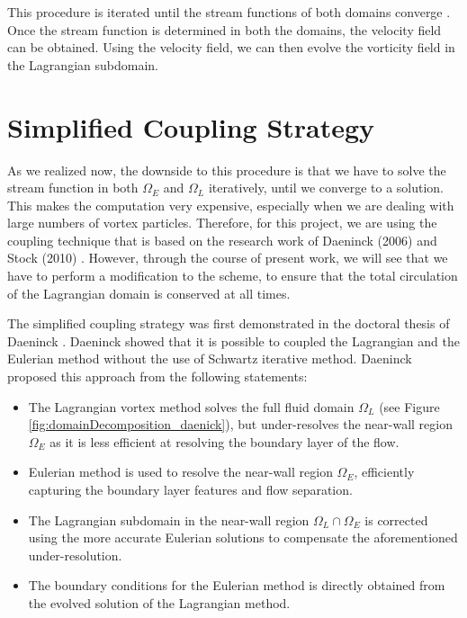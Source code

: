 	This procedure is iterated until the stream functions of both domains converge \cite{Ould-Salihi2001a}. Once the stream function is determined in both the domains, the velocity field can be obtained. Using the velocity field, we can then evolve the vorticity field in the Lagrangian subdomain.

	\section{Simplified Coupling Strategy}
	\label{sec:helvpm-scs}
	
	As we realized now, the downside to this procedure is that we have to solve the stream function in both $\Omega_E$ and $\Omega_L$ iteratively, until we converge to a solution. This makes the computation very expensive, especially when we are dealing with large numbers of vortex particles. Therefore, for this project, we are using the coupling technique that is based on the research work of Daeninck (2006) \cite{Daeninck2006} and Stock (2010) \cite{Stock2010a}. However, through the course of present work, we will see that we have to perform a modification to the scheme, to ensure that the total circulation of the Lagrangian domain is conserved at all times.	
	
	
	The simplified coupling strategy was first demonstrated in the doctoral thesis of Daeninck \cite{Daeninck2006}. Daeninck showed that it is possible to coupled the Lagrangian and the Eulerian method without the use of Schwartz iterative method. Daeninck proposed this approach from the following statements:
	
	\begin{itemize}
	\item The Lagrangian vortex method solves the full fluid domain $\Omega_L$ (see Figure \ref{fig:domainDecomposition_daenick}), but under-resolves the near-wall region $\Omega_E$ as it is less efficient at resolving the boundary layer of the flow.
	
	\item Eulerian method is used to resolve the near-wall region $\Omega_E$, efficiently capturing the boundary layer features and flow separation.
	
	\item The Lagrangian subdomain in the near-wall region $\Omega_L\cap\Omega_E$ is corrected using the more accurate Eulerian solutions to compensate the aforementioned under-resolution.
	
	\item The boundary conditions for the Eulerian method is directly obtained from the evolved solution of the Lagrangian method.
	\end{itemize}
	
